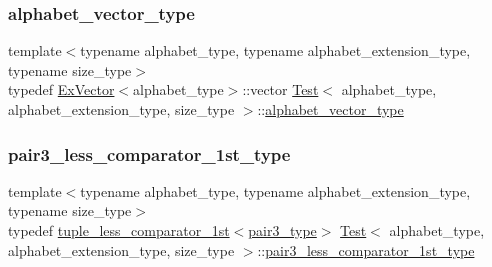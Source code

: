 \subsubsection{\texorpdfstring{alphabet\+\_\+vector\+\_\+type}{alphabet\_vector\_type}}
{\footnotesize\ttfamily template$<$typename alphabet\+\_\+type, typename alphabet\+\_\+extension\+\_\+type, typename size\+\_\+type$>$ \\
typedef \hyperlink{struct_ex_vector}{Ex\+Vector}$<$alphabet\+\_\+type$>$\+::vector \hyperlink{class_test}{Test}$<$ alphabet\+\_\+type, alphabet\+\_\+extension\+\_\+type, size\+\_\+type $>$\+::\hyperlink{class_test_aace52a5af52c5d5f457ec201881ab2ab}{alphabet\+\_\+vector\+\_\+type}\hspace{0.3cm}{\ttfamily [private]}}

\mbox{\label{class_test_a5ebabea22d5111680c158fb28c7cc935}} 
\subsubsection{\texorpdfstring{pair3\+\_\+less\+\_\+comparator\+\_\+1st\+\_\+type}{pair3\_less\_comparator\_1st\_type}}
{\footnotesize\ttfamily template$<$typename alphabet\+\_\+type, typename alphabet\+\_\+extension\+\_\+type, typename size\+\_\+type$>$ \\
typedef \hyperlink{structtuple__less__comparator__1st}{tuple\+\_\+less\+\_\+comparator\+\_\+1st}$<$\hyperlink{class_test_a9c312a6616c86eaf224d04d298f58ed4}{pair3\+\_\+type}$>$ \hyperlink{class_test}{Test}$<$ alphabet\+\_\+type, alphabet\+\_\+extension\+\_\+type, size\+\_\+type $>$\+::\hyperlink{class_test_a5ebabea22d5111680c158fb28c7cc935}{pair3\+\_\+less\+\_\+comparator\+\_\+1st\+\_\+type}\hspace{0.3cm}{\ttfamily [private]}}

\mbox{\label{class_test_aa25f2080d593eb18d6e5e475d99bac17}} 
